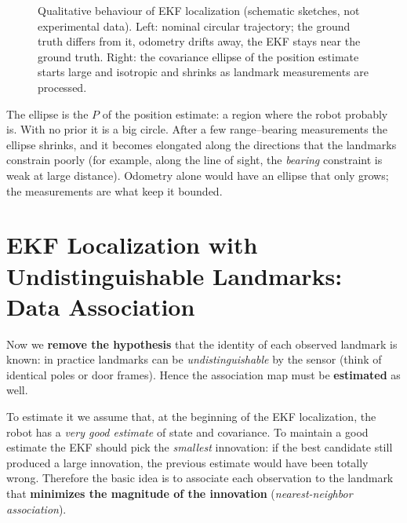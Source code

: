 \documentclass[11pt,a4paper]{article}
\def\bm#1{#1}%
\newcommand{\slides}[1]{\texorpdfstring{\hspace{0.5em}{\normalfont\small\emph{(#1)}}}{}}
\newcommand{\robot}[3][fill=white]{\begin{scope}[shift={(#2)},rotate=#3]\draw[#1,thick] (0.24,0)--(-0.16,0.15)--(-0.16,-0.15)--cycle;\end{scope}}
\theoremstyle{definition}
\theoremstyle{plain}
\theoremstyle{remark}
\begin{document}
\begin{figure}[H]
\begin{minipage}[t]{0.48\linewidth}
\end{minipage}
\caption{Qualitative behaviour of EKF localization (schematic sketches, not experimental data). Left: nominal circular trajectory; the ground truth differs from it, odometry drifts away, the EKF stays near the ground truth. Right: the covariance ellipse of the position estimate starts large and isotropic and shrinks as landmark measurements are processed.}
\label{fig:typical1}
\end{figure}

\begin{intuition}
The ellipse is the $\bm P$ of the position estimate: a region where the robot probably is. With no prior it is a big circle. After a few range--bearing measurements the ellipse shrinks, and it becomes elongated along the directions that the landmarks constrain poorly (for example, along the line of sight, the \emph{bearing} constraint is weak at large distance). Odometry alone would have an ellipse that only grows; the measurements are what keep it bounded.
\end{intuition}

\section{EKF Localization with Undistinguishable Landmarks: Data Association}
\label{sec:assoc}
\slides{slides 11--12}

Now we \textbf{remove the hypothesis} that the identity of each observed landmark is known: in practice landmarks can be \emph{undistinguishable} by the sensor (think of identical poles or door frames). Hence the association map must be \textbf{estimated} as well.

To estimate it we assume that, at the beginning of the EKF localization, the robot has a \emph{very good estimate} of state and covariance. To maintain a good estimate the EKF should pick the \emph{smallest} innovation: if the best candidate still produced a large innovation, the previous estimate would have been totally wrong. Therefore the basic idea is to associate each observation to the landmark that \textbf{minimizes the magnitude of the innovation} (\emph{nearest-neighbor association}).
\end{document}
